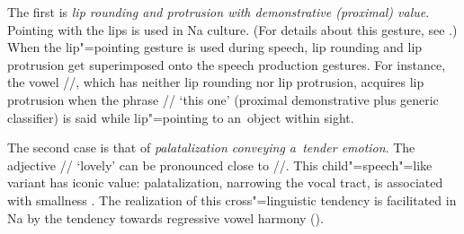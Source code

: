 			
			
The first is \textit{lip rounding and protrusion with demonstrative (proximal) value}. Pointing with the lips is used in Na culture. (For details about this gesture, see \citealt{enfield2001}.) When the lip"=pointing gesture is used during speech, lip rounding and lip protrusion get superimposed onto the speech production gestures. For instance, the vowel //, which has neither lip rounding nor lip protrusion, acquires lip protrusion when the
				phrase // ‘this one’ (proximal demonstrative plus generic classifier) is said while lip"=pointing to an~object within sight. 
				
The second case is that of \textit{palatalization conveying a~tender emotion}. The adjective // ‘lovely’ can be pronounced close to //. This
				child"=speech"=like variant has iconic value: palatalization, narrowing the vocal tract, is
				associated with smallness \citep[22--23]{fonagy1983}. The realization of this cross"=linguistic
				tendency is facilitated in Na by the tendency towards regressive vowel harmony ().

